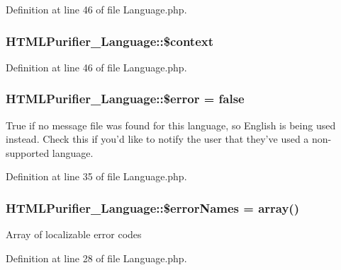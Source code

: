 Definition at line 46 of file Language.\+php.

\hypertarget{classHTMLPurifier__Language_ae4650de6fad492c6179523ae7ec7ba7d}{
\subsubsection[{\$context}]{\setlength{\rightskip}{0pt plus 5cm}H\+T\+M\+L\+Purifier\+\_\+\+Language\+::\$context}}\label{classHTMLPurifier__Language_ae4650de6fad492c6179523ae7ec7ba7d}


Definition at line 46 of file Language.\+php.

\hypertarget{classHTMLPurifier__Language_abb0604315d77bc0d8793c695be23a3c7}{
\subsubsection[{\$error}]{\setlength{\rightskip}{0pt plus 5cm}H\+T\+M\+L\+Purifier\+\_\+\+Language\+::\$error = false}}\label{classHTMLPurifier__Language_abb0604315d77bc0d8793c695be23a3c7}
True if no message file was found for this language, so English is being used instead. Check this if you'd like to notify the user that they've used a non-\/supported language. 

Definition at line 35 of file Language.\+php.

\hypertarget{classHTMLPurifier__Language_ab6f8454f90315876de68931909f1f7ac}{
\subsubsection[{\$error\+Names}]{\setlength{\rightskip}{0pt plus 5cm}H\+T\+M\+L\+Purifier\+\_\+\+Language\+::\$error\+Names = array()}}\label{classHTMLPurifier__Language_ab6f8454f90315876de68931909f1f7ac}
Array of localizable error codes 

Definition at line 28 of file Language.\+php.

